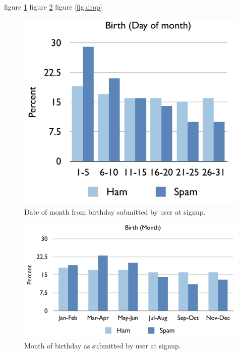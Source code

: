 \documentclass[preprint]{acm_proc_article-sp}
\begin{document}
figure \ref{fig:day}
figure \ref{fig:month}
figure \ref{fig:drop}
\begin{figure}[h]
    \centering
    \includegraphics[width=\linewidth]{figures/dob-day.pdf}
    \caption{Date of month from birthday submitted by user at signup.}
    \label{fig:day}
\end{figure}

\begin{figure}[h]
    \centering
    \includegraphics[width=\linewidth]{figures/dob-month.pdf}
    \caption{Month of birthday as submitted by user at signup.}
    \label{fig:month}
\end{figure}
\end{document}
